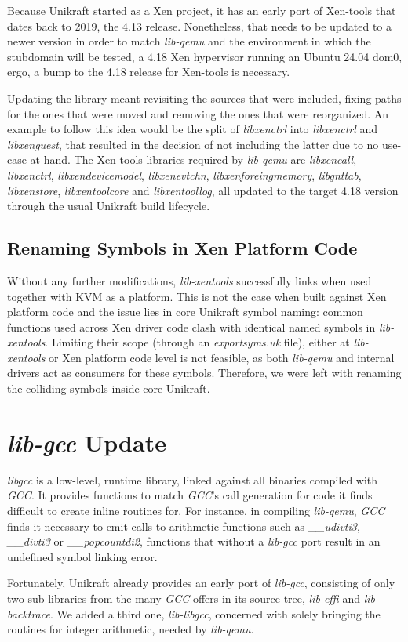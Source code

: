 Because Unikraft started as a Xen project, it has an early port of Xen-tools that dates back to 2019, the 4.13 release.
Nonetheless, that needs to be updated to a newer version in order to match \textit{lib-qemu} and the environment in which the stubdomain will be tested, a 4.18 Xen hypervisor running an Ubuntu 24.04 dom0, ergo, a bump to the 4.18 release for Xen-tools is necessary.

Updating the library meant revisiting the sources that were included, fixing paths for the ones that were moved and removing the ones that were reorganized.
An example to follow this idea would be the split of \textit{libxenctrl} into \textit{libxenctrl} and \textit{libxenguest}, that resulted in the decision of not including the latter due to no use-case at hand.
The Xen-tools libraries required by \textit{lib-qemu} are \textit{libxencall}, \textit{libxenctrl}, \textit{libxendevicemodel}, \textit{libxenevtchn}, \textit{libxenforeingmemory}, \textit{libgnttab}, \textit{libxenstore}, \textit{libxentoolcore} and \textit{libxentoollog}, all updated to the target 4.18 version through the usual Unikraft build lifecycle.

\subsection{Renaming Symbols in Xen Platform Code}
\label{subsec:xen-renaming-symbols}

Without any further modifications, \textit{lib-xentools} successfully links when used together with KVM as a platform.
This is not the case when built against Xen platform code and the issue lies in core Unikraft symbol naming: common functions used across Xen driver code clash with identical named symbols in \textit{lib-xentools}.
Limiting their scope (through an \textit{exportsyms.uk} file), either at \textit{lib-xentools} or Xen platform code level is not feasible, as both \textit{lib-qemu} and internal drivers act as consumers for these symbols.
Therefore, we were left with renaming the colliding symbols inside core Unikraft.

\section{\textit{lib-gcc} Update}
\label{sec:lib-gcc-update}

\textit{libgcc} \cite{libgcc} is a low-level, runtime library, linked against all binaries compiled with \textit{GCC}.
It provides functions to match \textit{GCC}'s call generation for code it finds difficult to create inline routines for.
For instance, in compiling \textit{lib-qemu}, \textit{GCC} finds it necessary to emit calls to arithmetic functions such as \textit{__udivti3}, \textit{__divti3} or \textit{__popcountdi2}, functions that without a \textit{lib-gcc} port result in an undefined symbol linking error.

Fortunately, Unikraft already provides an early port of \textit{lib-gcc}, consisting of only two sub-libraries from the many \textit{GCC} offers in its source tree, \textit{lib-effi} and \textit{lib-backtrace}.
We added a third one, \textit{lib-libgcc}, concerned with solely bringing the routines for integer arithmetic, needed by \textit{lib-qemu}.
